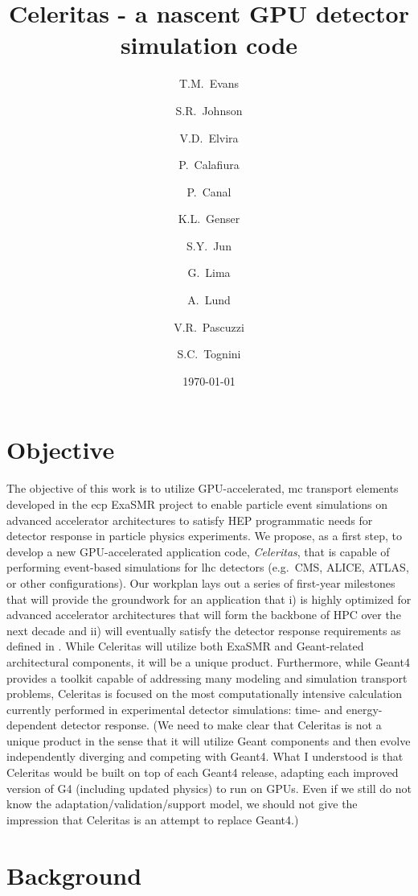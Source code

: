 \documentclass[10pt]{article}
\author[1]{T.M.~Evans}
\author[1]{S.R.~Johnson}
\author[2]{V.D.~Elvira}
\author[3]{P.~Calafiura}
\author[2]{P.~Canal}
\author[2]{K.L.~Genser}
\author[2]{S.Y.~Jun}
\author[2]{G.~Lima}
\author[4]{A.~Lund}
\author[3]{V.R.~Pascuzzi}
\author[1]{S.C.~Tognini}
\affil[1]{Oak Ridge National Laboratory}
\affil[2]{Fermi National Accelerator Laboratory}
\affil[3]{Lawrence Berkeley National Laboratory}
\affil[4]{Argonne National Laboratory}
\title{Celeritas - a nascent GPU detector simulation code}
\date{\today}
\begin{document}
\maketitle

\section*{Objective}

The objective of this work is to utilize GPU-accelerated, \ac{mc}
transport elements developed in the \ac{ecp}
ExaSMR project to enable particle event simulations on advanced
accelerator architectures to satisfy HEP programmatic needs for detector
response in particle physics experiments. We propose, as a first step,
to develop a new GPU-accelerated application code, \emph{Celeritas},
that is capable of performing event-based simulations for \ac{lhc} detectors
(e.g.~CMS, ALICE, ATLAS, or other configurations). Our workplan lays out
a series of first-year milestones that will provide the groundwork for
an application that i) is highly optimized for advanced accelerator
architectures that will form the backbone of HPC over the next decade
and ii) will eventually satisfy the detector response requirements as
defined in  \cite{the_hep_software_foundation_roadmap_2019}. While Celeritas will
utilize both ExaSMR and Geant-related architectural components, it will
be a unique product. Furthermore, while Geant4 provides a toolkit
capable of addressing many modeling and simulation transport problems,
Celeritas is focused on the most computationally intensive calculation
currently performed in experimental detector simulations: time-
and energy-dependent detector response.
(We need to make clear that Celeritas is not a unique product in the sense that it will utilize Geant components and then evolve independently diverging and competing with Geant4. What I understood is that Celeritas would be built on top of each Geant4 release, adapting each improved version of G4 (including updated physics) to run on GPUs. Even if we still do not know the adaptation/validation/support model, we should not give the impression that Celeritas is an attempt to replace Geant4.)

\section*{Background}
\end{document}
